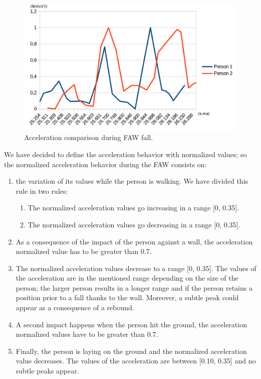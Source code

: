 \documentclass[review]{elsarticle}
\begin{document}
\begin{figure}[!ht]
	\centering
	\includegraphics[scale=0.25]{Images/TwoFallsComparative.png}
	\caption[Acceleration during FAW fall]{Acceleration comparison during FAW fall.}
	\label{fig:FAWcomparison}
\end{figure}

 We have decided to define the acceleration behavior with normalized values; so the normalized acceleration behavior during the FAW consists on:
\begin{enumerate}
	\item the variation of its values while the person is walking. We have divided this rule in two rules:
	\begin{enumerate}
		\item The normalized acceleration values go increasing in a range [0, 0.35].
		\item The normalized acceleration values go decreasing in a range [0, 0.35].
	\end{enumerate}
	\item As a consequence of the impact of the person against a wall, the acceleration normalized value has to be greater than 0.7.
	\item The normalized acceleration values decrease to a range [0, 0.35]. The values of the acceleration are in the mentioned range depending on the size of the person; the larger person results in a longer range and if the person retains a position prior to a fall thanks to the wall. Moreover, a subtle peak could appear as a consequence of a rebound.
	\item A second impact happens when the person hit the ground, the acceleration normalized values have to be greater than 0.7.
	\item Finally, the person is laying on the ground and the normalized acceleration value decreases. The values of the acceleration are between [0.10, 0.35] and no subtle peaks appear. 
\end{enumerate}
\end{document}
